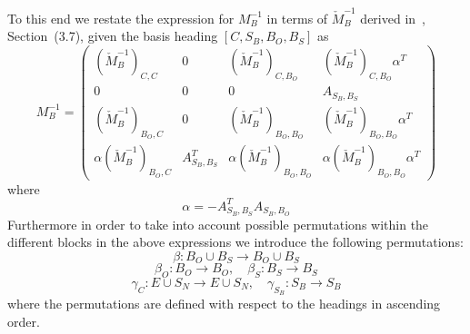 \documentclass[a4paper]{article}
\begin{document}
To this end we restate the expression for $M_{B}^{-1}$ in terms of 
$\check{M}_{B}^{-1}$ derived in~\cite{Frans_Deg}, Section~(3.7),
given the basis heading
$\left[C, S_{B}, B_{O}, B_{S}\right]$ as
\begin{equation}
\label{eq:M_B_inv_exp}
M_{B}^{-1}=
\left(\begin{array}{c|c|c|c}
        \left(\check{M}_{B}^{-1}\right)_{C,C} &
	0 &
	\left(\check{M}_{B}^{-1}\right)_{C,B_{O}} &
	 \left(\check{M}_{B}^{-1}\right)_{C, B_{O}}\alpha^{T} \\
	\hline
	0 &
	0 &
	0 &
	A_{S_{B},B_{S}} \\
	\hline
	\left(\check{M}_{B}^{-1}\right)_{B_{O}, C} &
	0 &
	\left(\check{M}_{B}^{-1}\right)_{B_{O}, B_{O}} &
          \left(\check{M}_{B}^{-1}\right)_{B_{O},B_{O}}\alpha^{T} \\
	\hline
	\alpha\left(\check{M}_{B}^{-1}\right)_{B_{O},
	C} &
	A_{S_{B}, B_{S}}^{T} &
	\alpha\left(\check{M}_{B}^{-1}\right)_{B_{O},
	B_{O}} &
	\alpha\left(\check{M}_{B}^{-1}\right)_{B_{O}, B_{O}}\alpha^{T}
      \end{array}
\right)
\end{equation}
where
\begin{equation*}
\alpha=-A_{S_{B}, B_{S}}^{T}A_{S_{B}, B_{O}}
\end{equation*}
Furthermore in order to take into account possible permutations within the
different blocks in the above expressions we introduce the following
permutations:
\begin{equation}
\beta: B_{O} \cup B_{S} \rightarrow B_{O} \cup B_{S} 
\end{equation}
\begin{equation}
\beta_{O}: B_{O}  \rightarrow  B_{O}, \quad
\beta_{S}: B_{S} \rightarrow  B_{S}
\end{equation}
\begin{equation}
\gamma_{C}: E \cup S_{N} \rightarrow  E \cup S_{N}, \quad
\gamma_{S_{B}}: S_{B} \rightarrow  S_{B} 
\end{equation}
where the permutations are defined with respect to the headings in ascending
order.
\end{document}
